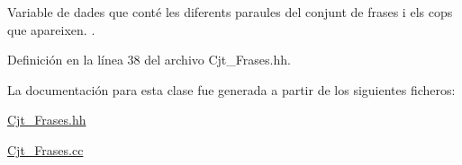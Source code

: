 Variable de dades que conté les diferents paraules del conjunt de frases i els cops que apareixen. . 



Definición en la línea 38 del archivo Cjt\+\_\+\+Frases.\+hh.



La documentación para esta clase fue generada a partir de los siguientes ficheros\+:\begin{DoxyCompactItemize}
\item 
\hyperlink{_cjt___frases_8hh}{Cjt\+\_\+\+Frases.\+hh}\item 
\hyperlink{_cjt___frases_8cc}{Cjt\+\_\+\+Frases.\+cc}\end{DoxyCompactItemize}

